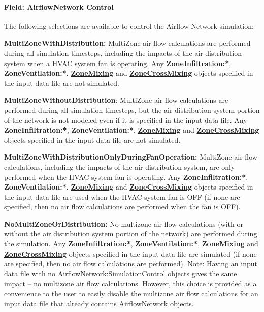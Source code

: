 \paragraph{Field: AirflowNetwork Control}\label{field-airflownetwork-control}

The following selections are available to control the Airflow Network simulation:

\textbf{MultiZoneWithDistribution:} MultiZone air flow calculations are performed during all simulation timesteps, including the impacts of the air distribution system when a HVAC system fan is operating. Any \textbf{ZoneInfiltration:*}, \textbf{ZoneVentilation:*}, \textbf{\hyperref[zonemixing]{ZoneMixing}} and \textbf{\hyperref[zonecrossmixing]{ZoneCrossMixing}} objects specified in the input data file are not simulated.

\textbf{MultiZoneWithoutDistribution}: MultiZone air flow calculations are performed during all simulation timesteps, but the air distribution system portion of the network is not modeled even if it is specified in the input data file. Any \textbf{ZoneInfiltration:*}, \textbf{ZoneVentilation:*}, \textbf{\hyperref[zonemixing]{ZoneMixing}} and \textbf{\hyperref[zonecrossmixing]{ZoneCrossMixing}} objects specified in the input data file are not simulated.

\textbf{MultiZoneWithDistributionOnlyDuringFanOperation:} MultiZone air flow calculations, including the impacts of the air distribution system, are only performed when the HVAC system fan is operating. Any \textbf{ZoneInfiltration:*}, \textbf{ZoneVentilation:*}, \textbf{\hyperref[zonemixing]{ZoneMixing}} and \textbf{\hyperref[zonecrossmixing]{ZoneCrossMixing}} objects specified in the input data file are used when the HVAC system fan is OFF (if none are specified, then no air flow calculations are performed when the fan is OFF).

\textbf{NoMultiZoneOrDistribution:} No multizone air flow calculations (with or without the air distribution system portion of the network) are performed during the simulation. Any \textbf{ZoneInfiltration:*}, \textbf{ZoneVentilation:*}, \textbf{\hyperref[zonemixing]{ZoneMixing}} and \textbf{\hyperref[zonecrossmixing]{ZoneCrossMixing}} objects specified in the input data file are simulated (if none are specified, then no air flow calculations are performed). Note: Having an input data file with no AirflowNetwork:\hyperref[simulationcontrol]{SimulationControl} objects gives the same impact -- no multizone air flow calculations. However, this choice is provided as a convenience to the user to easily disable the multizone air flow calculations for an input data file that already contains AirflowNetwork objects.

